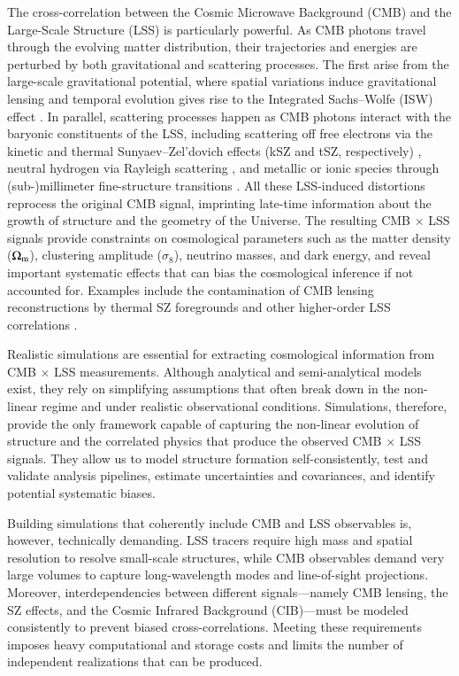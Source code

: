 \documentclass[]{aa} %
\begin{document}
The cross-correlation between the Cosmic Microwave Background (CMB) and the Large-Scale Structure (LSS) is particularly powerful. As CMB photons travel through the evolving matter distribution, their trajectories and energies are perturbed by both gravitational and scattering processes. The first arise from the large-scale gravitational potential, where spatial variations induce gravitational lensing \citep{lewisandchallinor2006} and temporal evolution gives rise to the Integrated Sachs–Wolfe (ISW) effect \citep{sachs&wolfe1967}. In parallel, scattering processes happen as CMB photons interact with the baryonic constituents of the LSS, including scattering off free electrons via the kinetic and thermal Sunyaev–Zel’dovich effects (kSZ and tSZ, respectively) \citep{kSZ_sunyaev_80,tSZ_sunyaev_72}, neutral hydrogen via Rayleigh scattering \citep{basu_2004,lewis_rayleigh_13}, and metallic or ionic species through (sub-)millimeter fine-structure transitions \citep{basu_2004,chm_metals_reio,chm_metals_pol}. All these LSS-induced distortions reprocess the original CMB signal, imprinting late-time information about the growth of structure and the geometry of the Universe. The resulting CMB $\times$ LSS signals provide constraints on cosmological parameters such as the matter density ($\Omega_{\rm m}$), clustering amplitude ($\sigma_8$), neutrino masses, and dark energy, \citep{cosmological_constraints_fromCMBxLSS_2021may_Chen,cosmological_constraints_fromCMBxLSS_2021dec_krolewski,cosmological_constraints_fromCMBxLSS_2024feb_shaikh} and reveal important systematic effects that can bias the cosmological inference if not accounted for. Examples include the contamination of CMB lensing reconstructions by thermal SZ foregrounds and other higher-order LSS correlations \citep{contaminationCMBlensing_2014mar_troxel}.

Realistic simulations are essential for extracting cosmological information from CMB $\times$ LSS measurements. Although analytical and semi-analytical models exist, they rely on simplifying assumptions that often break down in the non-linear regime and under realistic observational conditions. Simulations, therefore, provide the only framework capable of capturing the non-linear evolution of structure and the correlated physics that produce the observed CMB $\times$ LSS signals. They allow us to model structure formation self-consistently, test and validate analysis pipelines, estimate uncertainties and covariances, and identify potential systematic biases. 

Building simulations that coherently include CMB and LSS observables is, however, technically demanding. LSS tracers require high mass and spatial resolution to resolve small-scale structures, while CMB observables demand very large volumes to capture long-wavelength modes and line-of-sight projections. Moreover, interdependencies between different signals---namely CMB lensing, the SZ effects, and the Cosmic Infrared Background (CIB)---must be modeled consistently to prevent biased cross-correlations. Meeting these requirements imposes heavy computational and storage costs and limits the number of independent realizations that can be produced.
\end{document}
